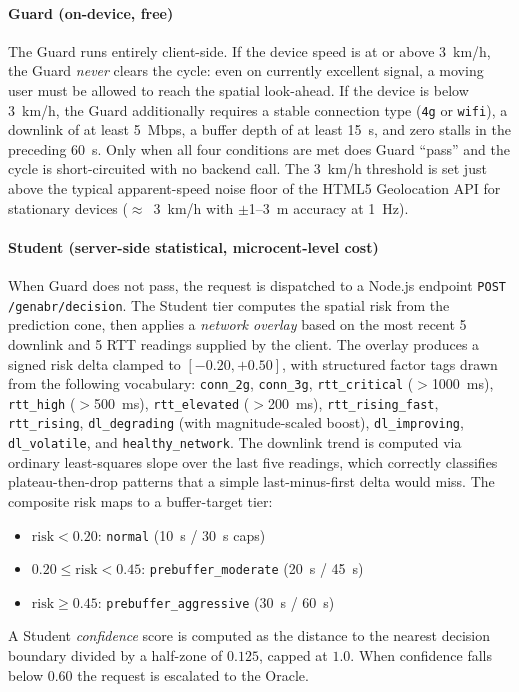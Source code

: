 \documentclass[conference]{IEEEtran}
\begin{document}
\paragraph{Guard (on-device, free)}
The Guard runs entirely client-side. If the device speed is at or above
3~km/h, the Guard \emph{never} clears the cycle: even on currently
excellent signal, a moving user must be allowed to reach the spatial
look-ahead. If the device is below 3~km/h, the Guard additionally requires
a stable connection type (\texttt{4g} or \texttt{wifi}), a downlink of at
least 5~Mbps, a buffer depth of at least 15~s, and zero stalls in the
preceding 60~s. Only when all four conditions are met does Guard ``pass''
and the cycle is short-circuited with no backend call. The 3~km/h
threshold is set just above the typical apparent-speed noise floor of the
HTML5 Geolocation API for stationary devices ($\approx$~3~km/h with
$\pm$1--3~m accuracy at 1~Hz).

\paragraph{Student (server-side statistical, microcent-level cost)}
When Guard does not pass, the request is dispatched to a Node.js endpoint
\texttt{POST /genabr/decision}. The Student tier computes the spatial
risk from the prediction cone, then applies a \emph{network overlay}
based on the most recent 5 downlink and 5 RTT readings supplied by the
client. The overlay produces a signed risk delta clamped to
$[-0.20, +0.50]$, with structured factor tags drawn from the following
vocabulary: \texttt{conn\_2g}, \texttt{conn\_3g},
\texttt{rtt\_critical} ($>$1000~ms), \texttt{rtt\_high} ($>$500~ms),
\texttt{rtt\_elevated} ($>$200~ms), \texttt{rtt\_rising\_fast},
\texttt{rtt\_rising}, \texttt{dl\_degrading} (with magnitude-scaled
boost), \texttt{dl\_improving}, \texttt{dl\_volatile}, and
\texttt{healthy\_network}. The downlink trend is computed via ordinary
least-squares slope over the last five readings, which correctly
classifies plateau-then-drop patterns that a simple last-minus-first
delta would miss. The composite risk maps to a buffer-target tier:
\begin{itemize}
  \item $\text{risk} < 0.20$: \texttt{normal} (10~s / 30~s caps)
  \item $0.20 \leq \text{risk} < 0.45$: \texttt{prebuffer\_moderate} (20~s / 45~s)
  \item $\text{risk} \geq 0.45$: \texttt{prebuffer\_aggressive} (30~s / 60~s)
\end{itemize}
A Student \emph{confidence} score is computed as the distance to the
nearest decision boundary divided by a half-zone of $0.125$, capped at
$1.0$. When confidence falls below $0.60$ the request is escalated to
the Oracle.
\end{document}
